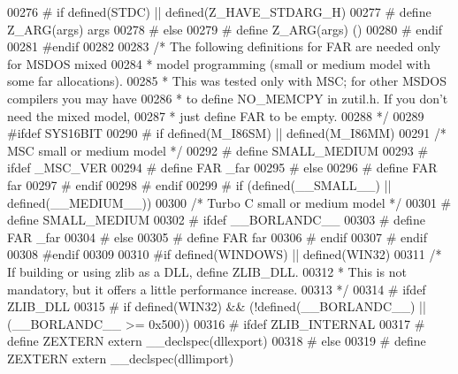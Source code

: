 \begin{DoxyCode}
00276 \textcolor{preprocessor}{#  if defined(STDC) || defined(Z\_HAVE\_STDARG\_H)}
00277 \textcolor{preprocessor}{#    define Z\_ARG(args)  args}
00278 \textcolor{preprocessor}{#  else}
00279 \textcolor{preprocessor}{#    define Z\_ARG(args)  ()}
00280 \textcolor{preprocessor}{#  endif}
00281 \textcolor{preprocessor}{#endif}
00282 
00283 \textcolor{comment}{/* The following definitions for FAR are needed only for MSDOS mixed}
00284 \textcolor{comment}{ * model programming (small or medium model with some far allocations).}
00285 \textcolor{comment}{ * This was tested only with MSC; for other MSDOS compilers you may have}
00286 \textcolor{comment}{ * to define NO\_MEMCPY in zutil.h.  If you don't need the mixed model,}
00287 \textcolor{comment}{ * just define FAR to be empty.}
00288 \textcolor{comment}{ */}
00289 \textcolor{preprocessor}{#ifdef SYS16BIT}
00290 \textcolor{preprocessor}{#  if defined(M\_I86SM) || defined(M\_I86MM)}
00291      \textcolor{comment}{/* MSC small or medium model */}
00292 \textcolor{preprocessor}{#    define SMALL\_MEDIUM}
00293 \textcolor{preprocessor}{#    ifdef \_MSC\_VER}
00294 \textcolor{preprocessor}{#      define FAR \_far}
00295 \textcolor{preprocessor}{#    else}
00296 \textcolor{preprocessor}{#      define FAR far}
00297 \textcolor{preprocessor}{#    endif}
00298 \textcolor{preprocessor}{#  endif}
00299 \textcolor{preprocessor}{#  if (defined(\_\_SMALL\_\_) || defined(\_\_MEDIUM\_\_))}
00300      \textcolor{comment}{/* Turbo C small or medium model */}
00301 \textcolor{preprocessor}{#    define SMALL\_MEDIUM}
00302 \textcolor{preprocessor}{#    ifdef \_\_BORLANDC\_\_}
00303 \textcolor{preprocessor}{#      define FAR \_far}
00304 \textcolor{preprocessor}{#    else}
00305 \textcolor{preprocessor}{#      define FAR far}
00306 \textcolor{preprocessor}{#    endif}
00307 \textcolor{preprocessor}{#  endif}
00308 \textcolor{preprocessor}{#endif}
00309 
00310 \textcolor{preprocessor}{#if defined(WINDOWS) || defined(WIN32)}
00311    \textcolor{comment}{/* If building or using zlib as a DLL, define ZLIB\_DLL.}
00312 \textcolor{comment}{    * This is not mandatory, but it offers a little performance increase.}
00313 \textcolor{comment}{    */}
00314 \textcolor{preprocessor}{#  ifdef ZLIB\_DLL}
00315 \textcolor{preprocessor}{#    if defined(WIN32) && (!defined(\_\_BORLANDC\_\_) || (\_\_BORLANDC\_\_ >= 0x500))}
00316 \textcolor{preprocessor}{#      ifdef ZLIB\_INTERNAL}
00317 \textcolor{preprocessor}{#        define ZEXTERN extern \_\_declspec(dllexport)}
00318 \textcolor{preprocessor}{#      else}
00319 \textcolor{preprocessor}{#        define ZEXTERN extern \_\_declspec(dllimport)}

\end{DoxyCode}
